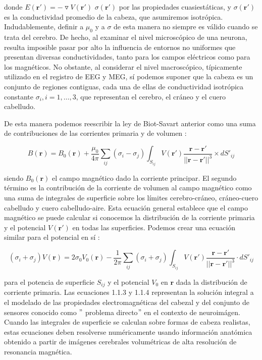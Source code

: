 \documentclass[11pt,letterpaper]{article}
\numberwithin{equation}{subsection}
\numberwithin{table}{subsection}
\begin{document}
\smallskip
\noindent donde $E(\mathbf{r}')=-\triangledown V(\mathbf{r}')$ $\sigma(\mathbf{r}')$ por las propiedades cuasiestáticas, y $\sigma(\mathbf{r}')$ es la conductividad promedio de la cabeza, que asumiremos isotrópica. Indudablemente, definir a $\mu_0$ y a $\sigma$ de esta manera no siempre es válido cuando se trata del cerebro. De hecho, al examinar el nivel microscópico de una neurona, resulta imposible pasar por alto la influencia de entornos no uniformes que presentan diversas conductividades, tanto para los campos eléctricos como para los magnéticos. No obstante, al considerar el nivel macroscópico, típicamente utilizado en el registro de EEG y MEG, sí podemos suponer que la cabeza es un conjunto de regiones contiguas, cada una de ellas de conductividad isotrópica constante $\sigma_i, i = 1,\ldots,3$, que representan el cerebro, el cráneo y el cuero cabelludo.


\bigskip
\noindent De esta manera  podemos reescribir la ley de Biot-Savart anterior como una suma de contribuciones de las corrientes primaria y de volumen \cite{hamalainen1993magnetoencephalography}: 

\begin{equation}
B(\mathbf{r}) = B_0(\mathbf{r}) + \frac{\mu_0}{4\pi}\sum_{ij}(\sigma_i - \sigma_j)\int_{S_{ij}}V(\mathbf{r}')\frac{\mathbf{r}-\mathbf{r}'}{||\mathbf{r}-\mathbf{r}'||^3}\times dS'_{ij}
\end{equation}

\smallskip
\noindent siendo $B_0(\mathbf{r})$ el campo magnético dado la corriente principar. El segundo término es la contribución de la corriente de volumen al campo magnético como una suma de integrales de superficie sobre los límites cerebro-cráneo, cráneo-cuero cabelludo y cuero cabelludo-aire. Esta ecuación general establece que el campo magnético se puede calcular si conocemos la distribución de la corriente primaria y el potencial $V(\mathbf{r}')$ en todas las superficies. Podemos crear una ecuación similar para el potencial en sí \cite{hamalainen1993magnetoencephalography, geselowitz1970magnetic}: 

\begin{equation}
(\sigma_i + \sigma_j)V(\mathbf{r}) = 2\sigma_0 V_0 (\mathbf{r}) -\frac{1}{2\pi}\sum_{ij}(\sigma_i + \sigma_j)\int_{S_{ij}}V(\textbf{r}')\frac{\mathbf{r}-\mathbf{r}'}{||\mathbf{r}-\mathbf{r}'||^3}\cdot dS'_{ij}
\end{equation}

\smallskip
\noindent para el potencia de superficie $S_{ij}$ y el potencial $V_0$ en $\mathbf{r}$ dada la distribución de corriente primaria. Las ecuaciones 1.1.3 y 1.1.4 representan la solución integral a el modelado de las propiedades electromagnéticas del cabezal y del conjunto de sensores conocido como $"$ problema directo$"$ en el contexto de neuroimágen.  Cuando las integrales de superficie se calculan sobre formas de cabeza realistas, estas ecuaciones deben resolverse numéricamente usando información anatómica obtenido a partir de imágenes cerebrales volumétricas de alta resolución de resonancia magnética. 
\end{document}

